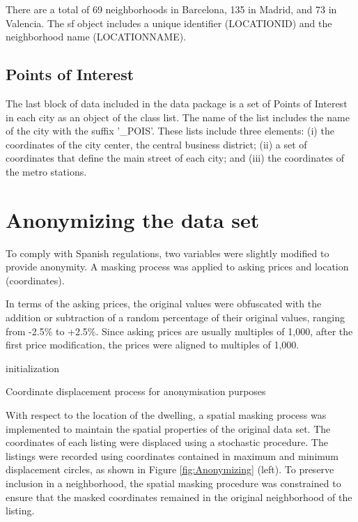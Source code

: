 \documentclass[Royal,times,sageh]{sagej}
\begin{document}
There are a total of 69 neighborhoods in Barcelona, 135 in Madrid, and
73 in Valencia. The sf object includes a unique identifier (LOCATIONID)
and the neighborhood name (LOCATIONNAME).

\hypertarget{points-of-interest}{%
\subsection{Points of Interest}\label{points-of-interest}}

The last block of data included in the data package is a set of Points
of Interest in each city as an object of the class list. The name of the
list includes the name of the city with the suffix '\_POIS'. These lists
include three elements: (i) the coordinates of the city center, the
central business district; (ii) a set of coordinates that define the
main street of each city; and (iii) the coordinates of the metro
stations.

\hypertarget{anonymizing}{%
\section{Anonymizing the data set}\label{anonymizing}}

To comply with Spanish regulations, two variables were slightly modified
to provide anonymity. A masking process was applied to asking prices and
location (coordinates).

In terms of the asking prices, the original values were obfuscated with
the addition or subtraction of a random percentage of their original
values, ranging from -2.5\% to +2.5\%. Since asking prices are usually
multiples of 1,000, after the first price modification, the prices were
aligned to multiples of 1,000.

\begin{algorithm}[!ht]
 initialization\;
 \caption{Coordinate displacement process for anonymisation purposes}
 \label{algo:coordinates-displacement}
\end{algorithm}

With respect to the location of the dwelling, a spatial masking process
was implemented to maintain the spatial properties of the original data
set. The coordinates of each listing were displaced using a stochastic
procedure. The listings were recorded using coordinates contained in
maximum and minimum displacement circles, as shown in Figure
\ref{fig:Anonymizing} (left). To preserve inclusion in a neighborhood,
the spatial masking procedure was constrained to ensure that the masked
coordinates remained in the original neighborhood of the listing.
\end{document}
